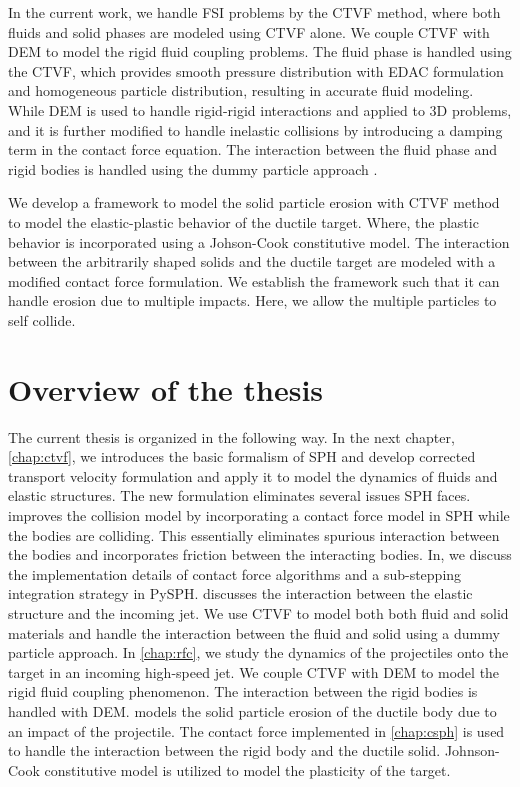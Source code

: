 In the current work, we handle FSI problems by the CTVF method, where both
fluids and solid phases are modeled using CTVF alone. We couple CTVF with DEM to
model the rigid fluid coupling problems. The fluid phase is handled using the
CTVF, which provides smooth pressure distribution with EDAC formulation and
homogeneous particle distribution, resulting in accurate fluid modeling. While
DEM is used to handle rigid-rigid interactions and applied to 3D problems, and
it is further modified to handle inelastic collisions by introducing a damping
term in the contact force equation. The interaction between the fluid phase and
rigid bodies is handled using the dummy particle approach \citep{Adami2012}.

We develop a framework to model the solid particle erosion with CTVF method to
model the elastic-plastic behavior of the ductile target. Where, the plastic
behavior is incorporated using a Johson-Cook constitutive model. The interaction
between the arbitrarily shaped solids and the ductile target are modeled with a
modified contact force formulation. We establish the framework such that it can
handle erosion due to multiple impacts. Here, we allow the multiple particles
to self collide.


\section{Overview of the thesis}
The current thesis is organized in the following way. In the next chapter,
\cref{chap:ctvf}, we introduces the basic formalism of SPH and develop corrected
transport velocity formulation and apply it to model the dynamics of fluids and
elastic structures. The new formulation eliminates several issues SPH faces.
 improves the collision model by incorporating a contact force
model in SPH while the bodies are colliding. This essentially eliminates
spurious interaction between the bodies and incorporates friction between the
interacting bodies. In, we discuss the
implementation details of contact force algorithms and a sub-stepping
integration strategy in PySPH.  discusses the interaction between
the elastic structure and the incoming jet. We use CTVF to model both both fluid
and solid materials and handle the interaction between the fluid and solid using
a dummy particle approach. In \cref{chap:rfc}, we study the dynamics of the
projectiles onto the target in an incoming high-speed jet. We couple CTVF with
DEM to model the rigid fluid coupling phenomenon. The interaction between the
rigid bodies is handled with DEM.  models the solid particle
erosion of the ductile body due to an impact of the projectile. The contact
force implemented in \cref{chap:csph} is used to handle the interaction between
the rigid body and the ductile solid. Johnson-Cook constitutive model is
utilized to model the plasticity of the target.


